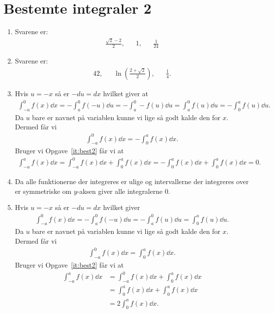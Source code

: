 \newpage
\section{Bestemte integraler 2}
\begin{enumerate}
	\item Svarene er:
	\begin{align*}
	\frac{\sqrt{2}-2}{2},&& 1,&& \frac{1}{24}
	\end{align*}
	
	
	
	\item Svarene er:
	\begin{align*}
	42,&& \ln(\frac{2+\sqrt{2}}{2}),&&\frac{1}{4}.
	\end{align*}
	
	\item\label{it:bes11ans} Hvis $u=-x$ så er $-du=dx$ hvilket giver at
	\begin{align*}
	\int_{-a}^{0}f(x) \dd x=-\int_{a}^{0} f(-u)\dd u=-\int_a^0-f(u) \dd u=\int_{a}^{0}f(u)\dd u=-\int_0^af(u)\dd u.
	\end{align*}
	Da $u$ bare er navnet på variablen kunne vi lige så godt kalde den for $x$. Dermed får vi
	\begin{align*}
	\int_{-a}^{0}f(x)\dd x=-\int_{0}^{a}f(x)\dd x.
	\end{align*}
	Bruger vi Opgave~\ref{it:best2} får vi at
	\begin{align*}
	\int_{-a}^{a}f(x)\dd x=\int_{-a}^{0}f(x)\dd x+\int_{0}^{a} f(x)\dd x=-\int_{0}^{a} f(x)\dd x+\int_{0}^{a} f(x)\dd x=0.
	\end{align*}
	
	\item Da alle funktionerne der integreres er ulige og intervallerne der integreres over er symmetriske om $y$-aksen giver alle integralerne $0$.
	
	\item Hvis $u=-x$ så er $-du=dx$ hvilket giver
	\begin{align*}
	\int_{-a}^{0}f(x)\dd x=-\int_{a}^{0} f(-u)\dd u=-\int_{a}^{0}f(u)\dd u=\int_0^a f(u)\dd u.
	\end{align*}
	Da $u$ bare er navnet på variablen kunne vi lige så godt kalde den for $x$. Dermed får vi
	\begin{align*}
	\int_{-a}^{0}f(x)\dd x=\int_{0}^{a}f(x)\dd x.
	\end{align*}
	Bruger vi Opgave~\ref{it:best2} får vi at
	\begin{align*}
	\int_{-a}^{a}f(x)\dd x&=\int_{-a}^{0}f(x)\dd x+\int_{0}^{a} f(x)\dd x\\&=\int_{0}^{a} f(x)\dd x+\int_{0}^{a} f(x)\dd x\\&=2\int_{0}^{a} f(x)\dd x.
	\end{align*}


\end{enumerate}

